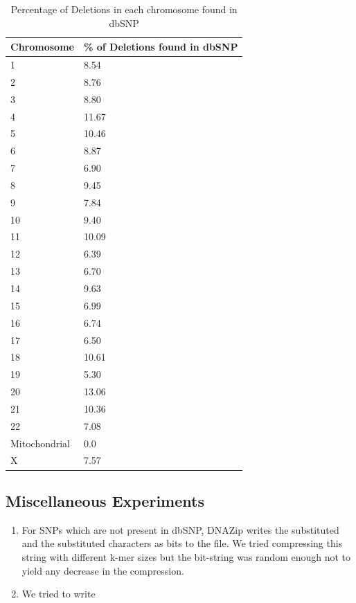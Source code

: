 \documentclass{article}
\begin{document}
\begin{table}[h]
\begin{center}

  	\begin{tabular}{|p{1in}|p{1in}|}
	
	\hline
	Chromosome	&		\% of Deletions found in dbSNP \\
	\hline
	1	&		8.54 \\
	\hline
	2	&		8.76 \\
	\hline
	3	&		8.80 \\
	\hline
	4	&	11.67 \\
	\hline
	5	&	10.46 \\
	\hline
	6	&	8.87 \\
	\hline
	7	&	6.90 \\
	\hline
	8	&	9.45 \\
	\hline
	9	&	7.84 \\
	\hline
	10	&	9.40 \\
	\hline
	11	&	10.09 \\
	\hline
	12	&	6.39 \\
	\hline
	13	&	6.70 \\
	\hline
	14	&	9.63 \\
	\hline
	15	&	6.99 \\
	\hline
	16	&	6.74 \\	
	\hline
	17	&	6.50 \\
	\hline	
	18	&	10.61 \\
	\hline	
	19	&	5.30 \\
	\hline
	20	&	13.06 \\	
	\hline
	21	&	10.36 \\
	\hline
	22	&	7.08  \\
	\hline
	Mitochondrial	&	0.0 \\
	\hline
	X	&	7.57 \\
	\hline
	\end{tabular}
\end{center}
  \caption {Percentage of Deletions in each chromosome found in dbSNP}
  \end{table}


\clearpage

\subsection {Miscellaneous Experiments}

\begin{enumerate}

\item For SNPs which are not present in dbSNP, DNAZip writes the substituted and
the substituted characters as bits to the file. We tried compressing this string
with different k-mer sizes but the bit-string was random enough not to yield 
any decrease in the compression.

\item We tried to write 

\end{enumerate}
\end{document}
